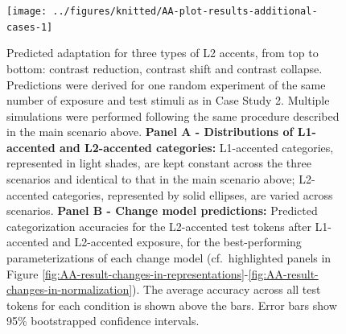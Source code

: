 \documentclass[
  11pt,
  man,floatsintext]{apa6}
\begin{document}
\begin{figure}

{\centering \texttt{[image: ../figures/knitted/AA-plot-results-additional-cases-1]} 

}

\caption{Predicted adaptation for three types of L2 accents, from top to bottom: contrast reduction, contrast shift and contrast collapse. Predictions were derived for one random experiment of the same number of exposure and test stimuli as in Case Study 2. Multiple simulations were performed following the same procedure described in the main scenario above. \textbf{Panel A - Distributions of L1-accented and L2-accented categories:} L1-accented categories, represented in light shades, are kept constant across the three scenarios and identical to that in the main scenario above; L2-accented categories, represented by solid ellipses, are varied across scenarios. \textbf{Panel B - Change model predictions:} Predicted categorization accuracies for the L2-accented test tokens after L1-accented and L2-accented exposure, for the best-performing parameterizations of each change model (cf.~highlighted panels in Figure \ref{fig:AA-result-changes-in-representations}-\ref{fig:AA-result-changes-in-normalization}). The average accuracy across all test tokens for each condition is shown above the bars. Error bars show 95\% bootstrapped confidence intervals.}\label{fig:AA-plot-results-additional-cases}
\end{figure}

\begin{table}

\caption{\label{tab:AA-table-best-performing-parameterization}Best-performing parameterizations across different accent scenarios (rounded). Recall that best-performing here refers to the parameterization that achieves the highest accuracy on L2-accented test tokens, rather than best quantitative fit against human data (which we do not have).}
\centering
{}
\end{table}
\end{document}

